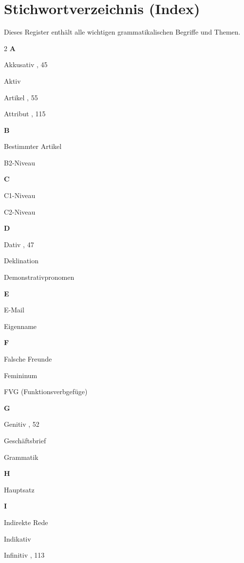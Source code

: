 \chapter{Stichwortverzeichnis (Index)}
\label{cha:Index}

Dieses Register enthält alle wichtigen grammatikalischen Begriffe und Themen.

\bigskip
\begin{center}
\begin{multicols}{2}
\textbf{A}
\item Akkusativ  , 45
\item Aktiv  
\item Artikel  , 55
\item Attribut  , 115

\textbf{B}
\item Bestimmter Artikel  
\item B2-Niveau  

\textbf{C}
\item C1-Niveau  
\item C2-Niveau  

\textbf{D}
\item Dativ  , 47
\item Deklination  
\item Demonstrativpronomen  

\textbf{E}
\item E-Mail  
\item Eigenname  

\textbf{F}
\item Falsche Freunde  
\item Femininum  
\item FVG (Funktionsverbgefüge)  

\textbf{G}
\item Genitiv  , 52
\item Geschäftsbrief  
\item Grammatik  

\textbf{H}
\item Hauptsatz  

\textbf{I}
\item Indirekte Rede  
\item Indikativ  
\item Infinitiv  , 113


\end{multicols}
\end{center}
